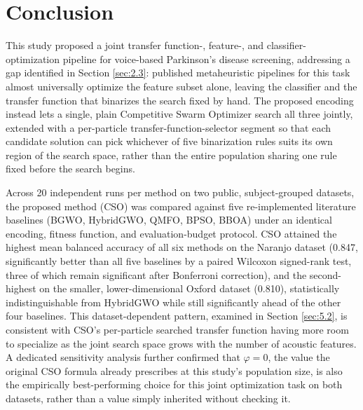 \section{Conclusion} \label{sec:6}
This study proposed a joint transfer function-, feature-, and classifier-optimization pipeline for voice-based Parkinson's disease screening, addressing a gap identified in Section \ref{sec:2.3}: published metaheuristic pipelines for this task almost universally optimize the feature subset alone, leaving the classifier and the transfer function that binarizes the search fixed by hand. The proposed encoding instead lets a single, plain Competitive Swarm Optimizer search all three jointly, extended with a per-particle transfer-function-selector segment so that each candidate solution can pick whichever of five binarization rules suits its own region of the search space, rather than the entire population sharing one rule fixed before the search begins.

Across 20 independent runs per method on two public, subject-grouped datasets, the proposed method (CSO) was compared against five re-implemented literature baselines (BGWO, HybridGWO, QMFO, BPSO, BBOA) under an identical encoding, fitness function, and evaluation-budget protocol. CSO attained the highest mean balanced accuracy of all six methods on the Naranjo dataset (0.847, significantly better than all five baselines by a paired Wilcoxon signed-rank test, three of which remain significant after Bonferroni correction), and the second-highest on the smaller, lower-dimensional Oxford dataset (0.810), statistically indistinguishable from HybridGWO while still significantly ahead of the other four baselines. This dataset-dependent pattern, examined in Section \ref{sec:5.2}, is consistent with CSO's per-particle searched transfer function having more room to specialize as the joint search space grows with the number of acoustic features. A dedicated sensitivity analysis further confirmed that $\varphi=0$, the value the original CSO formula already prescribes at this study's population size, is also the empirically best-performing choice for this joint optimization task on both datasets, rather than a value simply inherited without checking it.

